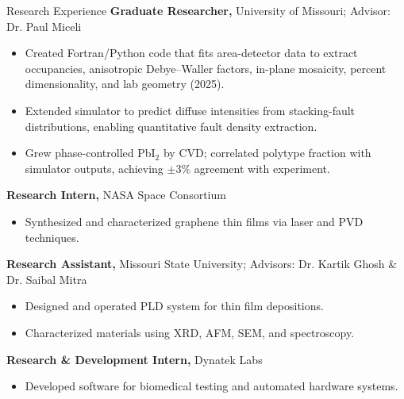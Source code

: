 \begin{rubric}{Research Experience}
    \entry*[2021 -- Present]%
        \textbf{Graduate Researcher,} University of Missouri; Advisor: Dr. Paul Miceli
        \begin{itemize}
            \item Created Fortran/Python code that fits area-detector data to extract occupancies, anisotropic Debye--Waller factors, in-plane mosaicity, percent dimensionality, and lab geometry (2025).
            \item Extended simulator to predict diffuse intensities from stacking-fault distributions, enabling quantitative fault density extraction.
            \item Grew phase-controlled PbI$_2$ by CVD; correlated polytype fraction with simulator outputs, achieving $\pm3\%$ agreement with experiment.
        \end{itemize}
    
    \entry*[2019 -- 2020]%
        \textbf{Research Intern,} NASA Space Consortium
        \begin{itemize}
            \item Synthesized and characterized graphene thin films via laser and PVD techniques.
        \end{itemize}
    
    \entry*[2017 -- 2020]%
        \textbf{Research Assistant,} Missouri State University; Advisors: Dr. Kartik Ghosh \& Dr. Saibal Mitra
        \begin{itemize}
            \item Designed and operated PLD system for thin film depositions.
            \item Characterized materials using XRD, AFM, SEM, and spectroscopy.
        \end{itemize}
    
    \entry*[2019]%
        \textbf{Research \& Development Intern,} Dynatek Labs
        \begin{itemize}
            \item Developed software for biomedical testing and automated hardware systems.
        \end{itemize}
\end{rubric}
